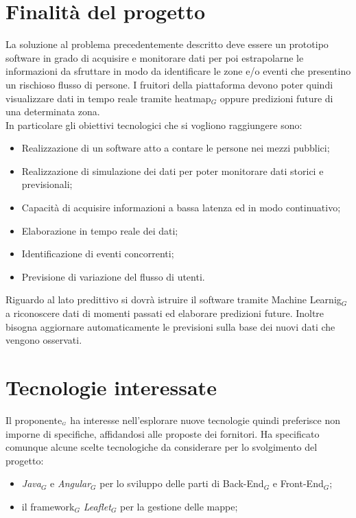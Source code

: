 \section{Finalità del progetto} \label{C3FinalitàDelProgetto}
La soluzione al problema precedentemente descritto deve essere un prototipo software in grado di acquisire e monitorare dati per poi estrapolarne le informazioni da sfruttare in modo da identificare le zone e/o  eventi che presentino un rischioso flusso di persone. I fruitori della piattaforma devono poter quindi visualizzare dati in tempo reale tramite heatmap$_G$ oppure predizioni future di una determinata zona. \\
In particolare gli obiettivi tecnologici che si vogliono raggiungere sono:
\begin{itemize}
	\item Realizzazione di un software atto a contare le persone nei mezzi pubblici;
	\item Realizzazione di simulazione dei dati per poter monitorare dati storici e previsionali;
	\item Capacità di acquisire informazioni a bassa latenza ed in modo continuativo;
	\item Elaborazione in tempo reale dei dati;
	\item Identificazione di eventi concorrenti;
	\item Previsione di variazione del flusso di utenti.
\end{itemize}
Riguardo al lato predittivo si dovrà istruire il software tramite Machine Learnig$_G$ a riconoscere dati di momenti passati ed elaborare predizioni future. Inoltre bisogna aggiornare automaticamente le previsioni sulla base dei nuovi dati che vengono osservati.
\section{Tecnologie interessate} \label{C3TecnologieInteressate}
Il proponente$_{\scaleto{G}{3pt}}$ ha interesse nell'esplorare nuove tecnologie quindi preferisce non imporne di specifiche, affidandosi alle proposte dei fornitori. Ha specificato comunque alcune scelte tecnologiche da considerare per lo svolgimento del progetto:
\begin{itemize}
	\item \textit{Java}$_G$ e \textit{Angular}$_G$ per lo sviluppo delle parti di Back-End$_G$ e Front-End$_G$;
	\item il framework$_G$ \textit{Leaflet}$_G$ per la gestione delle mappe;
\end{itemize}
